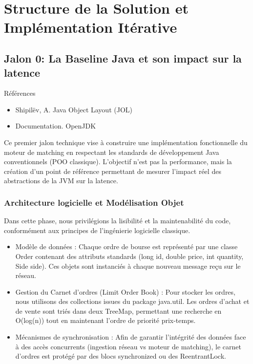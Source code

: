 \section{Structure de la Solution et Implémentation Itérative}

\subsection{Jalon 0: La Baseline Java et son impact sur la latence}

Références

\begin{itemize}
    \item  Shipilëv, A. Java Object Layout (JOL)
    \item Documentation. OpenJDK
\end{itemize}

Ce premier jalon technique vise à construire une implémentation fonctionnelle du moteur de matching en respectant les standards de développement Java conventionnels (POO classique). L'objectif n'est pas la performance, mais la création d'un point de référence permettant de mesurer l'impact réel des abstractions de la JVM sur la latence.

\subsubsection{Architecture logicielle et Modélisation Objet}

Dans cette phase, nous privilégions la lisibilité et la maintenabilité du code, conformément aux principes de l'ingénierie logicielle classique.

\begin{itemize}
    \item Modèle de données : Chaque ordre de bourse est représenté par une classe Order contenant des attributs standards (long id, double price, int quantity, Side side). Ces objets sont instanciés à chaque nouveau message reçu sur le réseau.
    \item Gestion du Carnet d'ordres (Limit Order Book) : Pour stocker les ordres, nous utilisons des collections issues du package java.util. Les ordres d'achat et de vente sont triés dans deux TreeMap, permettant une recherche en O(log(n)) tout en maintenant l'ordre de priorité prix-temps.
    \item Mécanismes de synchronisation : Afin de garantir l'intégrité des données face à des accès concurrents (ingestion réseau vs moteur de matching), le carnet d'ordres est protégé par des blocs synchronized ou des ReentrantLock.
\end{itemize}

